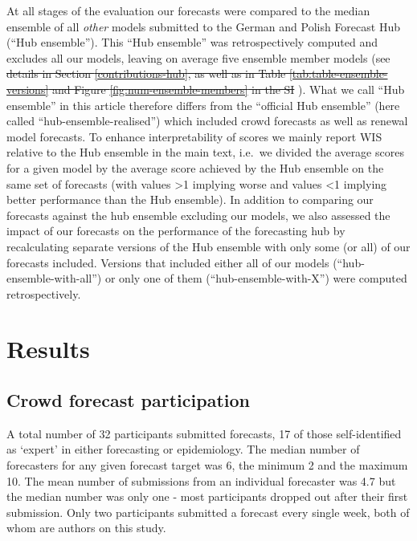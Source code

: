 \documentclass[10pt,letterpaper]{article}
\providecommand{\DIFaddtex}[1]{{\protect\color{blue}\uwave{#1}}} %
\providecommand{\DIFdeltex}[1]{{\protect\color{red}\sout{#1}}}                      %
\providecommand{\DIFaddbegin}{} %
\providecommand{\DIFaddend}{} %
\providecommand{\DIFdelbegin}{} %
\providecommand{\DIFdelend}{} %
\providecommand{\DIFadd}[1]{\texorpdfstring{\DIFaddtex{#1}}{#1}} %
\providecommand{\DIFdel}[1]{\texorpdfstring{\DIFdeltex{#1}}{}} %
\newcommand{\DIFscaledelfig}{0.5}
\newlength{\DIFdelgraphicswidth} %
\newlength{\DIFdelgraphicsheight} %
\newcommand{\DIFaddincludegraphics}[2][]{{\color{blue}\fbox{\DIFOincludegraphics[#1]{#2}}}} %
\newcommand{\DIFdelincludegraphics}[2][]{%
\sbox{\DIFdelgraphicsbox}{\DIFOincludegraphics[#1]{#2}}%
\settoboxwidth{\DIFdelgraphicswidth}{\DIFdelgraphicsbox} %
\settoboxtotalheight{\DIFdelgraphicsheight}{\DIFdelgraphicsbox} %
\scalebox{\DIFscaledelfig}{%
\parbox[b]{\DIFdelgraphicswidth}{\usebox{\DIFdelgraphicsbox}\\[-\baselineskip] \rule{\DIFdelgraphicswidth}{0em}}\llap{\resizebox{\DIFdelgraphicswidth}{\DIFdelgraphicsheight}{%
\setlength{\unitlength}{\DIFdelgraphicswidth}%
\begin{picture}(1,1)%
\thicklines\linethickness{2pt} %
{\color[rgb]{1,0,0}\put(0,0){\framebox(1,1){}}}%
{\color[rgb]{1,0,0}\put(0,0){\line( 1,1){1}}}%
{\color[rgb]{1,0,0}\put(0,1){\line(1,-1){1}}}%
\end{picture}%
}\hspace*{3pt}}} %
} %
\DeclareRobustCommand{\DIFaddbegin}{\DIFOaddbegin \let\includegraphics\DIFaddincludegraphics} %
\DeclareRobustCommand{\DIFaddend}{\DIFOaddend \let\includegraphics\DIFOincludegraphics} %
\DeclareRobustCommand{\DIFdelbegin}{\DIFOdelbegin \let\includegraphics\DIFdelincludegraphics} %
\DeclareRobustCommand{\DIFdelend}{\DIFOaddend \let\includegraphics\DIFOincludegraphics} %
\begin{document}
At all stages of the evaluation our forecasts were compared to the
median ensemble of all \emph{other} models submitted to the German and
Polish Forecast Hub (``Hub ensemble''). This ``Hub ensemble'' was
retrospectively computed and excludes all our models, leaving on average
five ensemble member models (see \DIFdelbegin \DIFdel{details in Section
\ref{contributions-hub}, as well as in Table
\ref{tab:table-ensemble-versions} and Figure
\ref{fig:num-ensemble-members} in the SI}\DIFdelend \DIFaddbegin {}
\DIFadd{and }\DIFaddend ). What we call ``Hub ensemble''
in this article therefore differs from the ``official Hub ensemble''
(here called ``hub-ensemble-realised'') which included crowd forecasts
as well as renewal model forecasts. To enhance interpretability of
scores we mainly report WIS relative to the Hub ensemble in the main
text, i.e.~we divided the average scores for a given model by the
average score achieved by the Hub ensemble on the same set of forecasts
(with values \textgreater1 implying worse and values \textless1 implying
better performance than the Hub ensemble). In addition to comparing our
forecasts against the hub ensemble excluding our models, we also
assessed the impact of our forecasts on the performance of the
forecasting hub by recalculating separate versions of the Hub ensemble
with only some (or all) of our forecasts included. Versions that
included either all of our models (``hub-ensemble-with-all'') or only
one of them (``hub-ensemble-with-X'') were computed retrospectively.

\hypertarget{results}{%
\section{Results}\label{results}}

\hypertarget{crowd-forecast-participation}{%
\subsection{Crowd forecast
participation}\label{crowd-forecast-participation}}

A total number of 32 participants submitted forecasts, 17 of those
self-identified as `expert' in either forecasting or epidemiology. The
median number of forecasters for any given forecast target was 6, the
minimum 2 and the maximum 10. The mean number of submissions from an
individual forecaster was 4.7 but the median number was only one - most
participants dropped out after their first submission. Only two
participants submitted a forecast every single week, both of whom are
authors on this study.
\end{document}
